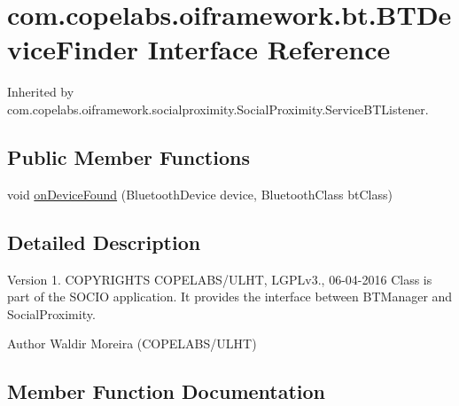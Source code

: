\hypertarget{interfacecom_1_1copelabs_1_1oiframework_1_1bt_1_1_b_t_device_finder}{}\section{com.\+copelabs.\+oiframework.\+bt.\+B\+T\+Device\+Finder Interface Reference}
\label{interfacecom_1_1copelabs_1_1oiframework_1_1bt_1_1_b_t_device_finder}


Inherited by com.\+copelabs.\+oiframework.\+socialproximity.\+Social\+Proximity.\+Service\+B\+T\+Listener.

\subsection*{Public Member Functions}
\begin{DoxyCompactItemize}
\item 
void \hyperlink{interfacecom_1_1copelabs_1_1oiframework_1_1bt_1_1_b_t_device_finder_a45eae54c7c796b5433047dbeb19bd56b}{on\+Device\+Found} (Bluetooth\+Device device, Bluetooth\+Class bt\+Class)
\end{DoxyCompactItemize}


\subsection{Detailed Description}
\begin{DoxyVersion}{Version}
1. C\+O\+P\+Y\+R\+I\+G\+H\+T\+S C\+O\+P\+E\+L\+A\+B\+S/\+U\+L\+H\+T, L\+G\+P\+Lv3., 06-\/04-\/2016 Class is part of the S\+O\+C\+I\+O application. It provides the interface between B\+T\+Manager and Social\+Proximity. 
\end{DoxyVersion}
\begin{DoxyAuthor}{Author}
Waldir Moreira (C\+O\+P\+E\+L\+A\+B\+S/\+U\+L\+H\+T) 
\end{DoxyAuthor}


\subsection{Member Function Documentation}
\hypertarget{interfacecom_1_1copelabs_1_1oiframework_1_1bt_1_1_b_t_device_finder_a45eae54c7c796b5433047dbeb19bd56b}{}
